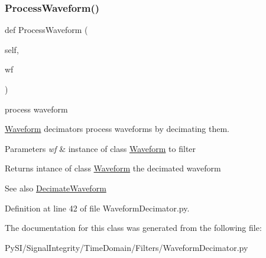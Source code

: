 \subsubsection{\texorpdfstring{Process\+Waveform()}{ProcessWaveform()}}
{\footnotesize\ttfamily def Process\+Waveform (\begin{DoxyParamCaption}\item[{}]{self,  }\item[{}]{wf }\end{DoxyParamCaption})}



process waveform 

\hyperlink{namespaceSignalIntegrity_1_1TimeDomain_1_1Waveform}{Waveform} decimators process waveforms by decimating them.


\begin{DoxyParams}{Parameters}
{\em wf} & instance of class \hyperlink{namespaceSignalIntegrity_1_1TimeDomain_1_1Waveform}{Waveform} to filter \\
\hline
\end{DoxyParams}
\begin{DoxyReturn}{Returns}
intance of class \hyperlink{namespaceSignalIntegrity_1_1TimeDomain_1_1Waveform}{Waveform} the decimated waveform 
\end{DoxyReturn}
\begin{DoxySeeAlso}{See also}
\hyperlink{classSignalIntegrity_1_1TimeDomain_1_1Filters_1_1WaveformDecimator_1_1WaveformDecimator_af90fbe6c62fc6e0c9c21732e9c094a9a}{Decimate\+Waveform} 
\end{DoxySeeAlso}


Definition at line 42 of file Waveform\+Decimator.\+py.



The documentation for this class was generated from the following file\+:\begin{DoxyCompactItemize}
\item 
Py\+S\+I/\+Signal\+Integrity/\+Time\+Domain/\+Filters/Waveform\+Decimator.\+py\end{DoxyCompactItemize}
